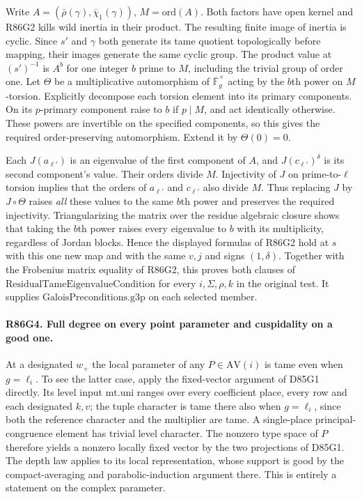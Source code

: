 Write $A=(\bar\rho(\gamma),\bar\chi_1(\gamma))$, $M=\mathrm{ord}(A)$.
Both factors have open kernel and R86G2 kills wild inertia in their
product. The resulting finite image of inertia is cyclic.
Since $s'$ and $\gamma$ both generate its tame quotient
topologically before mapping, their images generate the same cyclic
group. The product value at $(s')^{-1}$ is $A^b$ for one integer
$b$ prime to $M$, including the trivial group of order one.
Let $\Theta$ be a multiplicative automorphism of
$\overline{\mathbb F}_g^\times$ acting by the $b$th power on
$M$-torsion. Explicitly decompose each torsion element into its
primary components. On its $p$-primary component raise to $b$ if
$p\mid M$, and act identically otherwise. These powers are
invertible on the specified components, so this gives the required
order-preserving automorphism. Extend it by $\Theta(0)=0$.

Each $J(a_{\ell'})$ is an eigenvalue of the first component of
$A$, and $J(c_{\ell'})^\delta$ is its second component's value.
Their orders divide $M$. Injectivity of $J$ on prime-to-$\ell$
torsion implies that the orders of $a_{\ell'}$ and $c_{\ell'}$
also divide $M$. Thus replacing $J$ by $J\circ\Theta$ raises
\emph{all} these values to the same $b$th power and preserves the
required injectivity. Triangularizing the matrix over the residue
algebraic closure shows that taking the $b$th power raises every
eigenvalue to $b$ with its multiplicity, regardless of Jordan
blocks. Hence the displayed formulas of R86G2 hold at $s$ with this
one new map and with the same $v,j$ and signs $(1,\delta)$.
Together with the Frobenius matrix equality of R86G2, this proves
both clauses of $\mathrm{ResidualTameEigenvalueCondition}$ for
every $i,\Sigma,\rho,k$ in the original test. It supplies
$\mathrm{GaloisPreconditions.g3p}$ on each selected member.

\paragraph{R86G4. Full degree on every point parameter and cuspidality on a good one.}
At a designated $w_+$ the local parameter of any $P\in\mathrm{AV}(i)$
is tame even when $g=\ell_i$. To see the latter case, apply the
fixed-vector argument of D85G1 directly. Its level input
$\mathrm{mt.uni}$ ranges over every coefficient place, every row and
each designated $k,v$; the tuple character is tame there also when
$g=\ell_i$, since both the reference character and the multiplier
are tame. A single-place principal-congruence element has trivial
level character. The nonzero type space of $P$ therefore yields a
nonzero locally fixed vector by the two projections of D85G1. The
depth law applies to its local representation, whose support is good
by the compact-averaging and parabolic-induction argument there.
This is entirely a statement on the complex parameter.

